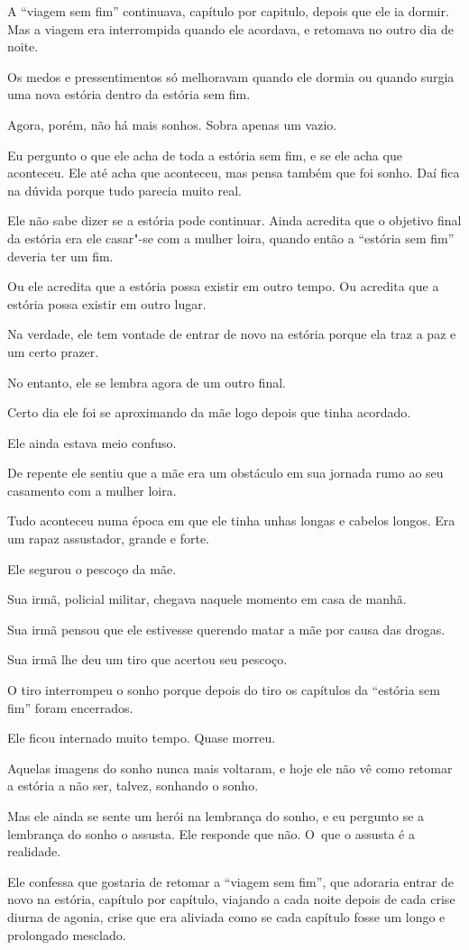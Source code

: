  

A ``viagem sem fim'' continuava, capítulo por capitulo, depois que ele
ia dormir. Mas a viagem era interrompida quando ele acordava, e retomava
no outro dia de noite.

Os medos e pressentimentos só melhoravam quando ele dormia ou quando
surgia uma nova estória dentro da estória sem fim.~

Agora, porém, não há mais sonhos. Sobra apenas um vazio.~

Eu pergunto o que ele acha de toda a estória sem fim, e se ele acha que
aconteceu. Ele até acha que aconteceu, mas pensa também que foi sonho.
Daí fica na dúvida porque tudo parecia muito real.~

Ele não sabe dizer se a estória pode continuar. Ainda acredita que o
objetivo final da estória era ele casar"-se com a mulher loira, quando
então a ``estória sem fim'' deveria ter um fim.~

Ou ele acredita que a estória possa existir em outro tempo. Ou acredita
que a estória possa existir em outro lugar.

Na verdade, ele tem vontade de entrar de novo na estória porque ela traz
a paz e um certo prazer.~

No entanto, ele se lembra agora de um outro final.

Certo dia ele foi se aproximando da mãe logo depois que tinha acordado.

Ele ainda estava meio confuso.~

De repente ele sentiu que a mãe era um obstáculo em sua jornada rumo ao
seu casamento com a mulher loira.~

Tudo aconteceu numa época em que ele tinha unhas longas e cabelos
longos. Era um rapaz assustador, grande e forte.~

Ele segurou o pescoço da mãe.~

Sua irmã, policial militar, chegava naquele momento em casa de manhã.~

Sua irmã pensou que ele estivesse querendo matar a mãe por causa das
drogas.~

Sua irmã lhe deu um tiro que acertou seu pescoço.~

O tiro interrompeu o sonho porque depois do tiro os capítulos da
``estória sem fim'' foram encerrados.~

Ele ficou internado muito tempo. Quase morreu.~

Aquelas imagens do sonho nunca mais voltaram, e hoje ele não vê como
retomar a estória a não ser, talvez, sonhando o sonho.~

Mas ele ainda se sente um herói na lembrança do sonho, e eu pergunto se
a lembrança do sonho o assusta. Ele responde que não. O~que o assusta é
a realidade.~

Ele confessa que gostaria de retomar a ``viagem sem fim'', que adoraria
entrar de novo na estória, capítulo por capítulo, viajando a cada noite
depois de cada crise diurna de agonia, crise que era aliviada como se
cada capítulo fosse um longo e prolongado mesclado. ~~

\subsubsection{}
